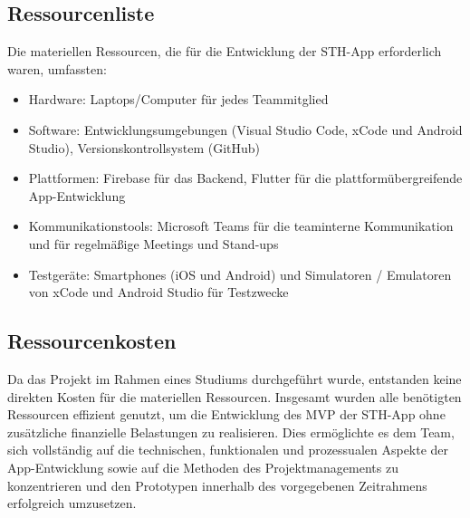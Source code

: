\subsection{Ressourcenliste}
Die materiellen Ressourcen, die für die Entwicklung der STH-App erforderlich waren, umfassten:
\begin{itemize}
    \item Hardware: Laptops/Computer für jedes Teammitglied
    \item Software: Entwicklungsumgebungen (Visual Studio Code, xCode und Android Studio), Versionskontrollsystem (GitHub)
    \item Plattformen: Firebase für das Backend, Flutter für die plattformübergreifende App-Entwicklung
    \item Kommunikationstools: Microsoft Teams für die teaminterne Kommunikation und für regelmäßige Meetings und Stand-ups
    \item Testgeräte: Smartphones (iOS und Android) und Simulatoren / Emulatoren von xCode und Android Studio für Testzwecke
\end{itemize}

\subsection{Ressourcenkosten}
Da das Projekt im Rahmen eines Studiums durchgeführt wurde, entstanden keine direkten Kosten für die materiellen Ressourcen.
Insgesamt wurden alle benötigten Ressourcen effizient genutzt, um die Entwicklung des MVP der STH-App ohne zusätzliche finanzielle Belastungen zu realisieren.
Dies ermöglichte es dem Team, sich vollständig auf die technischen, funktionalen und prozessualen Aspekte der App-Entwicklung sowie auf die Methoden des Projektmanagements zu konzentrieren und den Prototypen innerhalb des vorgegebenen Zeitrahmens erfolgreich umzusetzen.
